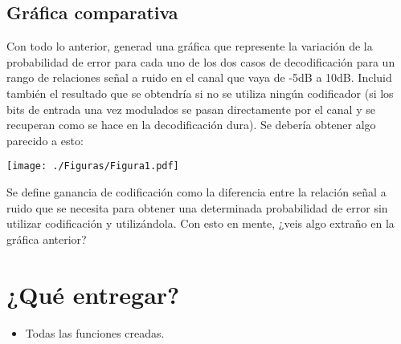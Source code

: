 \documentclass[es,practica,12pt]{uah}
\begin{document}
\subsection{Gráfica comparativa}

Con todo lo anterior, generad una gráfica que represente la variación de la probabilidad de error para cada uno de los dos casos de decodificación para un rango de relaciones señal a ruido en el canal que vaya de -5dB a 10dB. Incluid también el resultado que se obtendría si no se utiliza ningún codificador (si los bits de entrada una vez modulados se pasan directamente por el canal y se recuperan como se hace en la decodificación dura). Se debería obtener algo parecido a esto: 

\centering\texttt{[image: ./Figuras/Figura1.pdf]}

Se define ganancia de codificación como la diferencia entre la relación señal a ruido que se necesita para obtener una determinada probabilidad de error sin utilizar codificación y utilizándola. Con esto en mente, ¿veis algo extraño en la gráfica anterior?

\section{¿Qué entregar?}
\begin{itemize}
	\item Todas las funciones creadas.
\end{itemize}


\end{document}
